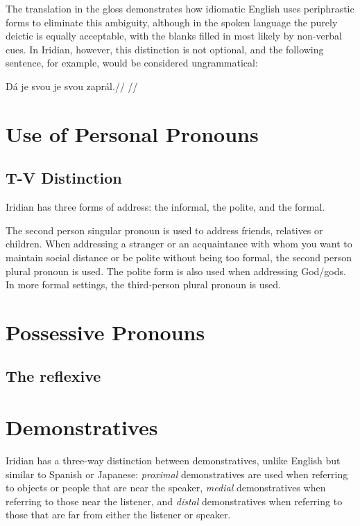 The translation in the gloss demonstrates how idiomatic English uses periphrastic forms to eliminate this ambiguity, although in the spoken language the purely deictic  is equally acceptable, with the blanks filled in most likely by non-verbal cues. In Iridian, however, this distinction is not optional, and the following sentence, for example, would be considered ungrammatical:

\ex
\begingl
\gla *D\'a je svou je svou zapr\'al.//
\glft {}//
\endgl
\xe

\section{Use of Personal Pronouns}

\subsection{T-V Distinction}

Iridian has three forms of address: the informal, the polite, and the formal.

The second person singular pronoun  is used to address friends, relatives or children. When addressing a stranger or an acquaintance with whom you want to maintain social distance or be polite without being too formal, the second person plural pronoun  is used. The polite form is also used when addressing God/gods. In more formal settings, the third-person plural pronoun  is used.



\section{Possessive Pronouns}

\subsection{The reflexive }

\section{Demonstratives}

Iridian has a three-way distinction between demonstratives, unlike English but similar to Spanish or Japanese: \emph{proximal} demonstratives are used when referring to objects or people that are near the speaker, \emph{medial} demonstratives when referring to those near the listener, and \emph{distal} demonstratives when referring to those that are far from either the listener or speaker.






